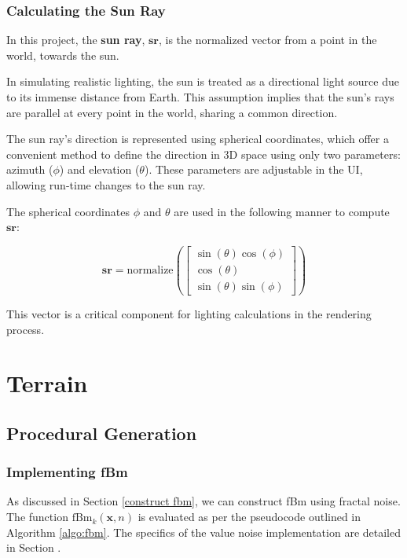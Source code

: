 \subsubsection{Calculating the Sun Ray}
\label{Sun Ray}

In this project, the \textbf{sun ray}, $\mathbf{sr}$, is the normalized vector from a point in the world, towards the sun. 

In simulating realistic lighting, the sun is treated as a directional light source due to its immense distance from Earth. This assumption implies that the sun's rays are parallel at every point in the world, sharing a common direction.

The sun ray's direction is represented using spherical coordinates, which offer a convenient method to define the direction in 3D space using only two parameters: azimuth ($\phi$) and elevation ($\theta$). These parameters are adjustable in the UI, allowing run-time changes to the sun ray.

The spherical coordinates $\phi$ and $\theta$ are used in the following manner to compute $\mathbf{sr}$:

\begin{equation}
    \mathbf{sr} = \text{normalize}\left( \begin{bmatrix} \sin(\theta) \cos(\phi) \\ \cos(\theta) \\ \sin(\theta) \sin(\phi) \end{bmatrix} \right)
\end{equation}

This vector is a critical component for lighting calculations in the rendering process.


\section{Terrain}
\label{Terrain}

\subsection{Procedural Generation}

\subsubsection{Implementing fBm}
\label{Implement fbm}

As discussed in Section \ref{construct fbm}, we can construct fBm using fractal noise. The function $\text{fBm}_k(\mathbf{x}, n)$ is evaluated as per the pseudocode outlined in Algorithm \ref{algo:fbm}. The specifics of the value noise implementation are detailed in Section .

